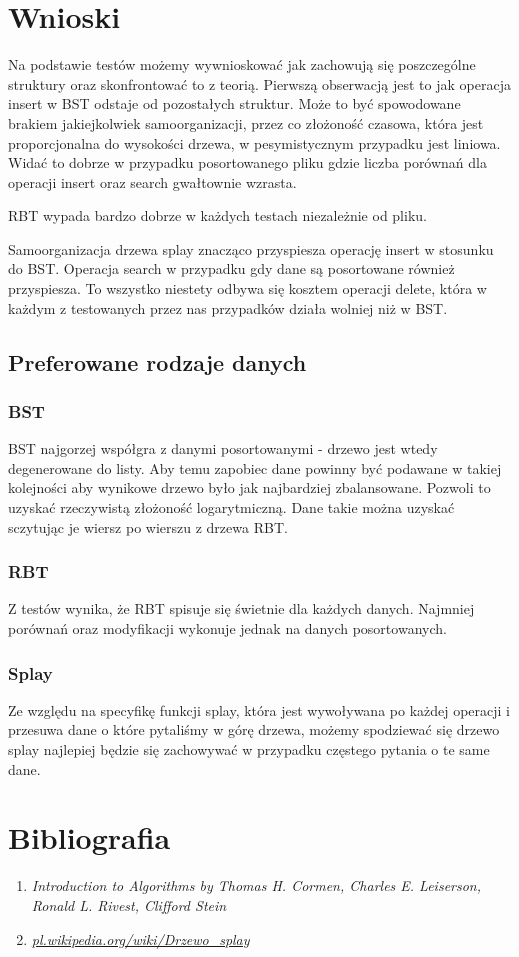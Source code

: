\documentclass[10pt,a4paper]{article}
\theoremstyle{definition}
\theoremstyle{definition}
\theoremstyle{definition}
\begin{document}
\section{Wnioski}
    Na podstawie testów możemy wywnioskować jak zachowują się poszczególne struktury oraz skonfrontować to z teorią. Pierwszą obserwacją jest to jak operacja insert w BST odstaje od pozostałych struktur. Może to być spowodowane brakiem jakiejkolwiek samoorganizacji, przez co złożoność czasowa, która jest proporcjonalna do wysokości drzewa, w pesymistycznym przypadku jest liniowa. Widać to dobrze w przypadku posortowanego pliku gdzie liczba porównań dla operacji insert oraz search gwałtownie wzrasta.
    
    RBT wypada bardzo dobrze w każdych testach niezależnie od pliku.
    
    Samoorganizacja drzewa splay znacząco przyspiesza operację insert w stosunku do BST. Operacja search w przypadku gdy dane są posortowane również przyspiesza. To wszystko niestety odbywa się kosztem operacji delete, która w każdym z testowanych przez nas przypadków działa wolniej niż w BST.
    
    
    \subsection{Preferowane rodzaje danych}
        \subsubsection{BST}
            BST najgorzej współgra z danymi posortowanymi - drzewo jest wtedy degenerowane do listy. Aby temu zapobiec dane powinny być podawane w takiej kolejności aby wynikowe drzewo było jak najbardziej zbalansowane. Pozwoli to uzyskać rzeczywistą złożoność logarytmiczną. Dane takie można uzyskać sczytując je wiersz po wierszu z drzewa RBT.
        \subsubsection{RBT}
            Z testów wynika, że RBT spisuje się świetnie dla każdych danych. Najmniej porównań oraz modyfikacji wykonuje jednak na danych posortowanych.
        \subsubsection{Splay}
            Ze względu na specyfikę funkcji splay, która jest wywoływana po każdej operacji i przesuwa dane o które pytaliśmy w górę drzewa, możemy spodziewać się drzewo splay najlepiej będzie się zachowywać w przypadku częstego pytania o te same dane.
\section{Bibliografia}
    \begin{enumerate}
        \item \textit{Introduction to Algorithms by Thomas H. Cormen, Charles E. Leiserson, Ronald L. Rivest, Clifford Stein}
        \item \href{https://pl.wikipedia.org/wiki/Drzewo_splay}{\textit{pl.wikipedia.org/wiki/Drzewo\_splay}}
    \end{enumerate}{}
    
\end{document}
